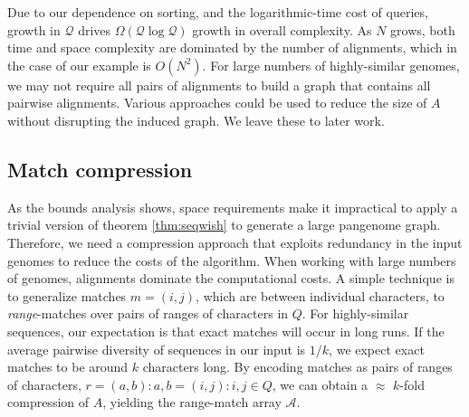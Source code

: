 \documentclass{bioinfo}
\theoremstyle{definition}
\begin{document}
Due to our dependence on sorting, and the logarithmic-time cost of queries, growth in $\mathcal{Q}$ drives $\Omega(\mathcal{Q} \log \mathcal{Q})$ growth in overall complexity.
As $N$ grows, both time and space complexity are dominated by the number of alignments, which in the case of our example is $O(N^2)$.
For large numbers of highly-similar genomes, we may not require all pairs of alignments to build a graph that contains all pairwise alignments.
Various approaches could be used to reduce the size of $A$ without disrupting the induced graph.
We leave these to later work.





\subsection{Match compression}
\label{sec:matchcompression}

As the bounds analysis shows, space requirements make it impractical to apply a trivial version of theorem \ref{thm:seqwish} to generate a large pangenome graph.
Therefore, we need a compression approach that exploits redundancy in the input genomes to reduce the costs of the algorithm.
When working with large numbers of genomes, alignments dominate the computational costs.
A simple technique is to generalize matches $m = (i, j)$, which are between individual characters, to \textit{range}-matches over pairs of ranges of characters in $Q$.
For highly-similar sequences, our expectation is that exact matches will occur in long runs.
If the average pairwise diversity of sequences in our input is $1/k$, we expect exact matches to be around $k$ characters long.
By encoding matches as pairs of ranges of characters, $r = (a, b) : a, b = (i, j) : i, j \in Q$, we can obtain a $\approx$ $k$-fold compression of $A$, yielding the range-match array $\mathcal{A}$.
\end{document}
